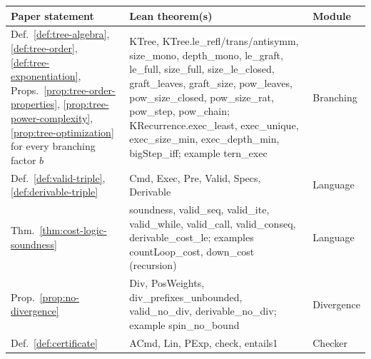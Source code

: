 \documentclass[oneside,english]{amsart}
\numberwithin{equation}{section}
\numberwithin{figure}{section}
\theoremstyle{plain}
\theoremstyle{definition}
\theoremstyle{plain}
\theoremstyle{remark}
\theoremstyle{plain}
\theoremstyle{definition}
\theoremstyle{plain}
\theoremstyle{remark}
\newcommand{\lean}[1]{{\ttfamily\small #1}}
\begin{document}
\begin{table}[p]
\centering
\scriptsize
\setlength{\tabcolsep}{3pt}
\begin{tabular}{@{}>{\raggedright\arraybackslash}p{}>{\raggedright\arraybackslash}p{}>{\raggedright\arraybackslash}p{}@{}}
\toprule
Paper statement & Lean theorem(s) & Module \\
\midrule
Def.~\ref{def:tree-algebra}, \ref{def:tree-order}, \ref{def:tree-exponentiation}, Props.~\ref{prop:tree-order-properties}, \ref{prop:tree-power-complexity}, \ref{prop:tree-optimization} for every branching factor $b$ & \lean{KTree}, \lean{KTree.\allowbreak le\_\allowbreak refl/\allowbreak trans/\allowbreak antisymm}, \lean{size\_\allowbreak mono}, \lean{depth\_\allowbreak mono}, \lean{le\_\allowbreak graft}, \lean{le\_\allowbreak full}, \lean{size\_\allowbreak full}, \lean{size\_\allowbreak le\_\allowbreak closed}, \lean{graft\_\allowbreak leaves}, \lean{graft\_\allowbreak size}, \lean{pow\_\allowbreak leaves}, \lean{pow\_\allowbreak size\_\allowbreak closed}, \lean{pow\_\allowbreak size\_\allowbreak rat}, \lean{pow\_\allowbreak step}, \lean{pow\_\allowbreak chain}; \lean{KRecurrence.\allowbreak exec\_\allowbreak least}, \lean{exec\_\allowbreak unique}, \lean{exec\_\allowbreak size\_\allowbreak min}, \lean{exec\_\allowbreak depth\_\allowbreak min}, \lean{bigStep\_\allowbreak iff}; example \lean{tern\_\allowbreak exec} & \lean{Branching} \\
Def.~\ref{def:valid-triple}, \ref{def:derivable-triple} & \lean{Cmd}, \lean{Exec}, \lean{Pre}, \lean{Valid}, \lean{Specs}, \lean{Derivable} & \lean{Language} \\
Thm.~\ref{thm:cost-logic-soundness} & \lean{soundness}, \lean{valid\_\allowbreak seq}, \lean{valid\_\allowbreak ite}, \lean{valid\_\allowbreak while}, \lean{valid\_\allowbreak call}, \lean{valid\_\allowbreak conseq}, \lean{derivable\_\allowbreak cost\_\allowbreak le}; examples \lean{countLoop\_\allowbreak cost}, \lean{down\_\allowbreak cost} (recursion) & \lean{Language} \\
Prop.~\ref{prop:no-divergence} & \lean{Div}, \lean{PosWeights}, \lean{div\_\allowbreak prefixes\_\allowbreak unbounded}, \lean{valid\_\allowbreak no\_\allowbreak div}, \lean{derivable\_\allowbreak no\_\allowbreak div}; example \lean{spin\_\allowbreak no\_\allowbreak bound} & \lean{Divergence} \\
Def.~\ref{def:certificate} & \lean{ACmd}, \lean{Lin}, \lean{PExp}, \lean{check}, \lean{entails1} & \lean{Checker} \\

\end{tabular}
\end{table}
\end{document}

